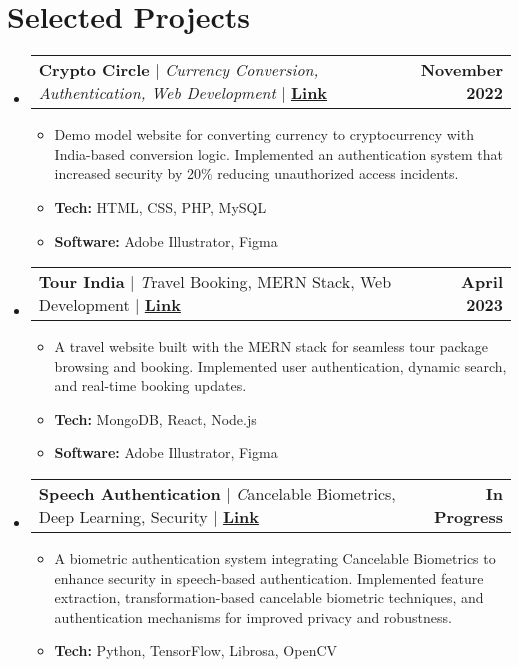 \documentclass[letterpaper,11pt]{article}
\makeatletter
\newcommand{\resumeItem}[1]{
  \item\small{
	{#1 \vspace{-2pt}}
  }
}
\newcommand{\resumeProjectHeading}[2]{
	\item
	\begin{tabular*}{1.001\textwidth}{l@{\extracolsep{\fill}}r}
  	\small#1 & \textbf{\small #2}\\
	\end{tabular*}\vspace{-7pt}
}
\newcommand{\resumeSubHeadingListStart}{\begin{itemize}[leftmargin=0.0in, label={}]}
\newcommand{\resumeSubHeadingListEnd}{\end{itemize}}
\newcommand{\resumeItemListStart}{\begin{itemize}}
\newcommand{\resumeItemListEnd}{\end{itemize}\vspace{-5pt}}
\makeatother
\begin{document}
\section{Selected Projects}
	\vspace{-5pt}
	\resumeSubHeadingListStart
	\resumeProjectHeading
      	{\textbf{Crypto Circle} $|$ \emph{Currency Conversion, Authentication, Web Development }$|$ \href{https://github.com/Shreelfaldu/Crypto-Website}{\textbf{Link}}}{November 2022}
      	\resumeItemListStart
        	\resumeItem{Demo model website for converting currency to cryptocurrency with India-based conversion logic. Implemented an authentication system that increased security by 20\% reducing unauthorized access incidents.}
        	\resumeItem{\textbf{Tech:} HTML, CSS, PHP, MySQL}
                \resumeItem{\textbf{Software:} Adobe Illustrator, Figma}
      	\resumeItemListEnd
	\vspace{-13pt}
  	\resumeProjectHeading
      	{\textbf{Tour India} $|$ \emph Travel Booking, MERN Stack, Web Development $|$ \href{https://github.com/Shreelfaldu/Tour-india}{\textbf{Link}}}{April 2023}
      	\resumeItemListStart
        	\resumeItem{A travel website built with the MERN stack for seamless tour package browsing and booking. Implemented user authentication, dynamic search, and real-time booking updates.}
                \resumeItem{\textbf{Tech:} MongoDB, React, Node.js}
                \resumeItem{\textbf{Software: }Adobe Illustrator, Figma}
      	\resumeItemListEnd
        \vspace{-13pt}
  	\resumeProjectHeading
      	{\textbf{Speech Authentication} $|$ \emph Cancelable Biometrics, Deep Learning, Security $|$ \href{https://github.com/Shreelfaldu/Speech_Aurthentication}{\textbf{Link}}}{In Progress}
      	\resumeItemListStart
        	\resumeItem{A biometric authentication system integrating Cancelable Biometrics to enhance security in speech-based authentication. Implemented feature extraction, transformation-based cancelable biometric techniques, and authentication mechanisms for improved privacy and robustness.}
                \resumeItem{\textbf{Tech:} Python, TensorFlow, Librosa, OpenCV}
            \resumeItemListEnd
	\resumeSubHeadingListEnd

\end{document}
